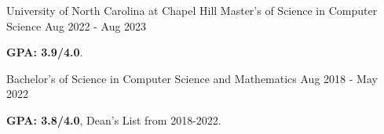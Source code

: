 \begin{cventries}
    \cvedentry
      {University of North Carolina at Chapel Hill} %
      {Master's of Science in Computer Science} %
      {Aug 2022 - Aug 2023}
      {
        \begin{cvitems} %
          \item {\textbf{GPA: 3.9/4.0}. }
        \end{cvitems}
      }
      {Bachelor's of Science in Computer Science and Mathematics} %
      {Aug 2018 - May 2022} %
      {
        \begin{cvitems} %
          \item {\textbf{GPA: 3.8/4.0}, Dean's List from 2018-2022.}
        \end{cvitems}
      }
\end{cventries}
